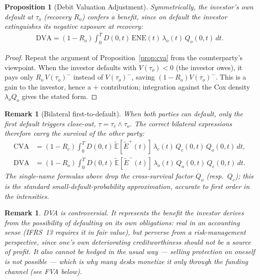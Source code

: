 \documentclass{report}
\theoremstyle{spacedplain}
\newtheorem{proposition}[theorem]{Proposition}
\theoremstyle{spaceddefinition}
\theoremstyle{spacedremark}
\newtheorem{remark}[theorem]{Remark}
\begin{document}
\begin{proposition}[Debit Valuation Adjustment]\label{prop:dva}
Symmetrically, the investor's own default at $\tau_o$ (recovery $R_o$) confers a benefit, since on default the investor extinguishes its negative exposure at recovery:
\begin{align}
    \text{DVA} = (1-R_o)\int_0^T D(0,t)\,\text{ENE}(t)\,\lambda_o(t)\,Q_o(0,t)\,dt.
\end{align}
\end{proposition}

\begin{proof}
Repeat the argument of Proposition~\ref{prop:cva} from the counterparty's viewpoint. When the investor defaults with $V(\tau_o)<0$ (the investor owes), it pays only $R_o\,V(\tau_o)^-$ instead of $V(\tau_o)^-$, saving $(1-R_o)V(\tau_o)^-$. This is a gain to the investor, hence a $+$ contribution; integration against the Cox density $\lambda_o Q_o$ gives the stated form.
\end{proof}

\begin{remark}[Bilateral first-to-default]
When both parties can default, only the \emph{first} default triggers close-out, $\tau=\tau_c\wedge\tau_o$. The correct bilateral expressions therefore carry the survival of the \emph{other} party:
\begin{align}
    \text{CVA} &= (1-R_c)\!\int_0^T\! D(0,t)\,\widetilde{\mathbb{E}}[\widetilde{E}^+(t)]\,\lambda_c(t)\,Q_c(0,t)\,Q_o(0,t)\,dt,\\
    \text{DVA} &= (1-R_o)\!\int_0^T\! D(0,t)\,\widetilde{\mathbb{E}}[\widetilde{E}^-(t)]\,\lambda_o(t)\,Q_o(0,t)\,Q_c(0,t)\,dt.
\end{align}
The single-name formulas above drop the cross-survival factor $Q_o$ (resp.\ $Q_c$); this is the standard small-default-probability approximation, accurate to first order in the intensities.
\end{remark}

\begin{remark}
DVA is controversial. It represents the benefit the investor derives from the possibility of defaulting on its own obligations: real in an accounting sense (IFRS~13 requires it in fair value), but perverse from a risk-management perspective, since one's own deteriorating creditworthiness should not be a source of profit. It also cannot be hedged in the usual way --- selling protection on oneself is not possible --- which is why many desks monetize it only through the funding channel (see FVA below).
\end{remark}
\end{document}
